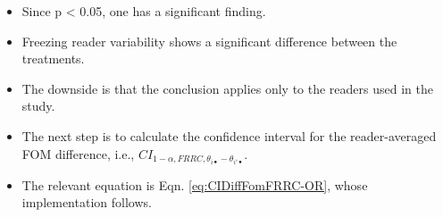 \documentclass[
]{book}
\providecommand{\tightlist}{%
  \setlength{\itemsep}{0pt}\setlength{\parskip}{0pt}}
\begin{document}
\begin{itemize}
\tightlist
\item
  Since p \textless{} 0.05, one has a significant finding.
\item
  Freezing reader variability shows a significant difference between the treatments.
\item
  The downside is that the conclusion applies only to the readers used in the study.
\item
  The next step is to calculate the confidence interval for the reader-averaged FOM difference, i.e., \(CI_{1-\alpha,FRRC,\theta_{i \bullet} - \theta_{i' \bullet}}\).
\item
  The relevant equation is Eqn. \eqref{eq:CIDiffFomFRRC-OR}, whose implementation follows.
\end{itemize}
\end{document}
